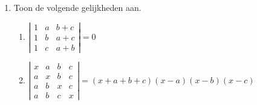 \begin{enumerate}
\item Toon de volgende gelijkheden aan.
\begin{enumerate}
\item $\left|\begin{array}{ccc}
 1      &a      &b+c \\
 1      &b      &a+c \\
 1      &c      &a+b
 \end{array}\right|=0$
 \item $\left|\begin{array}{cccc}
 x      &a      &b      &c \\
 a      &x      &b      &c \\
 a      &b      &x      &c \\
 a      &b      &c      &x
 \end{array}\right|=(x+a+b+c)(x-a)(x-b)(x-c)$

\end{enumerate}
\end{enumerate}
